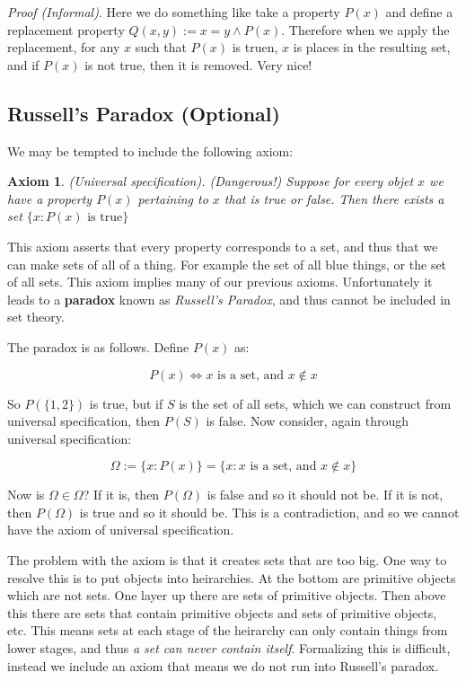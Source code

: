 \documentclass{article}
\newtheorem{axiom}{Axiom}[section]
\let\bf\textbf
\let\it\textit
\begin{document}
\it{Proof (Informal)}. Here we do something like take a property 
$P(x)$ and define a replacement property $Q(x,y) := x = y \land P(x)$. 
Therefore when we apply the replacement, for any $x$ such that $P(x)$ is 
truen, $x$ is places in the resulting set, and if $P(x)$ is not true, 
then it is removed. Very nice!

\subsection{Russell's Paradox (Optional)}

We may be tempted to include the following axiom: 

\begin{axiom}
	(Universal specification). (Dangerous!) Suppose for every
	objet $x$ we have a property $P(x)$ pertaining to $x$ that 
	is true or false. Then there exists a set $\{x : P(x) \text{ is true}\}$
\end{axiom}

This axiom asserts that every property corresponds to a set, and thus that 
we can make sets of all of a thing. For example the set of all blue things, 
or the set of all sets. This axiom implies many of our previous axioms. 
Unfortunately it leads to a \bf{paradox} known as 
\it{Russell's Paradox}, and thus cannot be included in set theory.

The paradox is as follows. Define $P(x)$ as: 

$$
P(x) \iff x \text{ is a set, and } x \notin x 
$$

So $P(\{1,2\})$ is true, but if $S$ is the set of all sets, which 
we can construct from universal specification, then $P(S)$ is false.
Now consider, again through universal specification: 

$$
\Omega := \{x : P(x) \} = \{x : x \text{ is a set, and } x \notin x\}
$$

Now is $\Omega \in \Omega$? If it is, then $P(\Omega)$ is false and so it 
should not be. If it is not, then $P(\Omega)$ is true and so it should be. 
This is a contradiction, and so we cannot have the axiom of universal
specification.

The problem with the axiom is that it creates sets that are too big.
One way to resolve this is to put objects into heirarchies. At the bottom 
are primitive objects which are not sets. One layer up there 
are sets of primitive objects. Then above this there are sets 
that contain primitive objects and sets of primitive objects, etc. 
This means sets at each stage of the heirarchy can only contain 
things from lower stages, and thus \it{a set can never contain itself}.
Formalizing this is difficult, instead we include an axiom that means 
we do not run into Russell's paradox.
\end{document}
